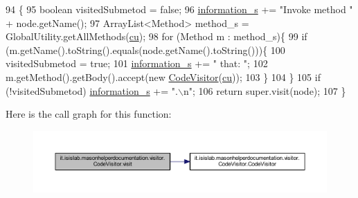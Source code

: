 \begin{DoxyCode}
94                                                 \{
95         \textcolor{keywordtype}{boolean} visitedSubmetod = \textcolor{keyword}{false};
96         \hyperlink{classit_1_1isislab_1_1masonhelperdocumentation_1_1visitor_1_1_code_visitor_a8bfc263e47218ff87b62a5ad9b1294e7}{information\_s} += \textcolor{stringliteral}{"Invoke method "} + node.getName();
97         ArrayList<Method> method\_s = GlobalUtility.getAllMethods(\hyperlink{classit_1_1isislab_1_1masonhelperdocumentation_1_1visitor_1_1_code_visitor_af9088f73f92fd3640698ad4e660f042b}{cu});
98         \textcolor{keywordflow}{for} (Method m : method\_s)\{
99             \textcolor{keywordflow}{if} (m.getName().toString().equals(node.getName().toString()))\{
100                 visitedSubmetod = \textcolor{keyword}{true};
101                 \hyperlink{classit_1_1isislab_1_1masonhelperdocumentation_1_1visitor_1_1_code_visitor_a8bfc263e47218ff87b62a5ad9b1294e7}{information\_s} += \textcolor{stringliteral}{" that: "};
102                 m.getMethod().getBody().accept(\textcolor{keyword}{new} \hyperlink{classit_1_1isislab_1_1masonhelperdocumentation_1_1visitor_1_1_code_visitor_a187184161108b27007b877d0c2370443}{CodeVisitor}(\hyperlink{classit_1_1isislab_1_1masonhelperdocumentation_1_1visitor_1_1_code_visitor_af9088f73f92fd3640698ad4e660f042b}{cu}));
103             \}
104         \}
105         \textcolor{keywordflow}{if} (!visitedSubmetod) \hyperlink{classit_1_1isislab_1_1masonhelperdocumentation_1_1visitor_1_1_code_visitor_a8bfc263e47218ff87b62a5ad9b1294e7}{information\_s} += \textcolor{stringliteral}{".\(\backslash\)n"};
106         \textcolor{keywordflow}{return} super.visit(node);
107     \}
\end{DoxyCode}


Here is the call graph for this function\-:\nopagebreak
\begin{figure}[H]
\begin{center}
\leavevmode
\includegraphics[width=350pt]{classit_1_1isislab_1_1masonhelperdocumentation_1_1visitor_1_1_code_visitor_a217f515da74b716c9d3fb43027be8301_cgraph}
\end{center}
\end{figure}




